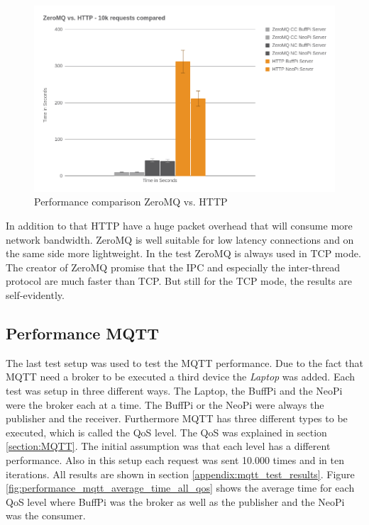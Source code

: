 \begin{figure}[H]
    \centering
    \includegraphics[width=\textwidth]{resources/images/performance_zeromq_vs_http.png}
    \caption[Performance comparison ZeroMQ vs. HTTP]{Performance comparison ZeroMQ vs. HTTP}
    \label{fig:performance_zeromq_vs_http}
\end{figure}

In addition to that \ac{HTTP} have a huge packet overhead that will consume more network bandwidth.
ZeroMQ is well suitable for low latency connections and on the same side more lightweight.
In the test ZeroMQ is always used in \ac{TCP} mode.
The creator of ZeroMQ promise that the \ac{IPC} and especially the inter-thread protocol are much faster than \ac{TCP}.\autocite[cf.]{ZeroMQ:UicastTransports}
But still for the \ac{TCP} mode, the results are self-evidently.


\subsection{Performance MQTT}
The last test setup was used to test the MQTT performance.
Due to the fact that MQTT need a broker to be executed a third device the \textit{Laptop} was added.
Each test was setup in three different ways.
The Laptop, the BuffPi and the NeoPi were the broker each at a time.
The BuffPi or the NeoPi were always the publisher and the receiver.
Furthermore MQTT has three different types to be executed, which is called the \ac{QoS} level.
The \ac{QoS} was explained in section \ref{section:MQTT}.
The initial assumption was that each level has a different performance.
Also in this setup each request was sent 10.000 times and in ten iterations.
All results are shown in section \ref{appendix:mqtt_test_results}.
Figure \ref{fig:performance_mqtt_average_time_all_qos} shows the average time for each \ac{QoS} level where BuffPi was the broker as well as the publisher and the NeoPi was the consumer.

